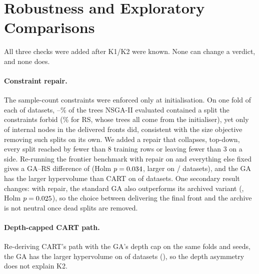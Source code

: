 \documentclass[11pt]{article}
\newcommand{\GA}{GA\xspace}
\newcommand{\RS}{RS\xspace}
\begin{document}
\section{Robustness and Exploratory Comparisons}
\label{sec:robust}

All three checks were added after K1/K2 were known. None can change a verdict, and none
does.

\paragraph{Constraint repair.} The sample-count constraints were enforced only at
initialisation. On one fold of each of \ViolDatasets{} datasets, \ViolMin--\ViolMax\% of
the trees NSGA-II evaluated contained a split the constraints forbid (\ViolRS\% for \RS,
whose trees all come from the initialiser), yet only \ViolDelivered{} of
\ViolDeliveredOf{} internal nodes in the delivered fronts did, consistent with the size
objective removing such splits on its own. We added a repair that collapses, top-down,
every split reached by fewer than 8 training rows or leaving fewer than 3 on a side.
Re-running the frontier benchmark with repair on and everything else fixed gives a
\GA--\RS{} difference of \RepairKoneDiff{} (Holm $p=0.034$, larger on
\RepairKoneWins/\NDatasets{} datasets), and the \GA has the larger hypervolume than CART
on \RepairKtwoRate{} of datasets. One secondary result changes: with repair, the standard
\GA also outperforms its archived variant (\RepairArchDiff, Holm $p=0.025$), so
the choice between delivering the final front and the archive is not neutral once dead
splits are removed.

\paragraph{Depth-capped CART path.} Re-deriving CART's path with the \GA's depth cap on the
same folds and seeds, the \GA has the larger hypervolume on \CappedKtwoWins{} of
\NDatasets{} datasets (\CappedKtwoRate), so the depth asymmetry does not explain K2.
\end{document}
